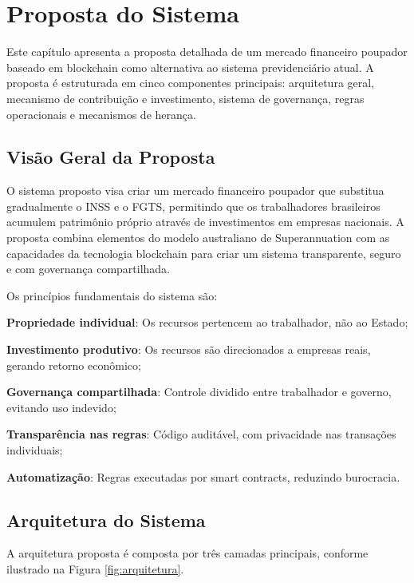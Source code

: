 \chapter{Proposta do Sistema}
\label{cap:resultados}

Este capítulo apresenta a proposta detalhada de um mercado financeiro poupador baseado em blockchain como alternativa ao sistema previdenciário atual. A proposta é estruturada em cinco componentes principais: arquitetura geral, mecanismo de contribuição e investimento, sistema de governança, regras operacionais e mecanismos de herança.

\section{Visão Geral da Proposta}

O sistema proposto visa criar um mercado financeiro poupador que substitua gradualmente o INSS e o FGTS, permitindo que os trabalhadores brasileiros acumulem patrimônio próprio através de investimentos em empresas nacionais. A proposta combina elementos do modelo australiano de Superannuation com as capacidades da tecnologia blockchain para criar um sistema transparente, seguro e com governança compartilhada.

Os princípios fundamentais do sistema são:
\begin{alineas}
    \item \textbf{Propriedade individual}: Os recursos pertencem ao trabalhador, não ao Estado;
    \item \textbf{Investimento produtivo}: Os recursos são direcionados a empresas reais, gerando retorno econômico;
    \item \textbf{Governança compartilhada}: Controle dividido entre trabalhador e governo, evitando uso indevido;
    \item \textbf{Transparência nas regras}: Código auditável, com privacidade nas transações individuais;
    \item \textbf{Automatização}: Regras executadas por smart contracts, reduzindo burocracia.
\end{alineas}

\section{Arquitetura do Sistema}

A arquitetura proposta é composta por três camadas principais, conforme ilustrado na Figura \ref{fig:arquitetura}.

